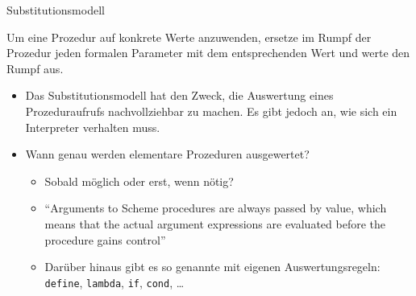 \begin{frame}[t,fragile]{Substitutionsmodell}
	\begin{mybox}
		Um eine Prozedur auf konkrete Werte anzuwenden, ersetze im Rumpf der Prozedur jeden formalen Parameter mit dem entsprechenden Wert und werte den Rumpf aus.
	\end{mybox}
	
	\vspace*{0.5cm}
	
	\begin{itemize}
		\item {} Das Substitutionsmodell hat den Zweck, die Auswertung eines Prozeduraufrufs nachvollziehbar zu machen.
		Es gibt jedoch  an, wie sich ein Interpreter verhalten muss.
		\item Wann genau werden elementare Prozeduren ausgewertet? \label{folie:subst-bem}
		\begin{itemize}
			\item Sobald möglich oder erst, wenn nötig?
			\item \enquote{Arguments to Scheme procedures are always passed by value, which means that the actual argument expressions are evaluated before the procedure gains control}  \pause
			\item Darüber hinaus gibt es so genannte  mit eigenen Auswertungsregeln: \texttt{define}, \texttt{lambda}, \texttt{if}, \texttt{cond}, \dots
		\end{itemize}		
	\end{itemize}
\end{frame}